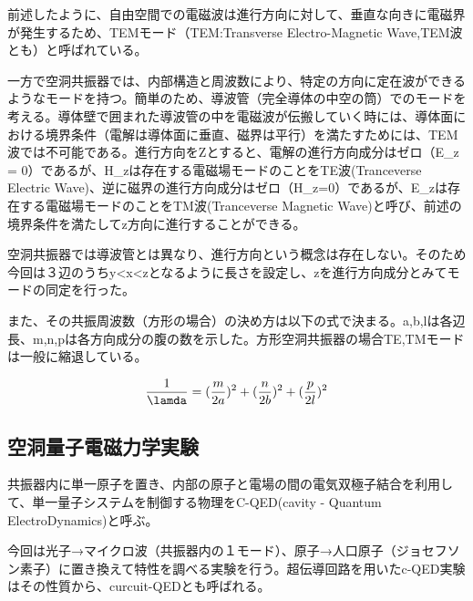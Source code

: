 前述したように、自由空間での電磁波は進行方向に対して、垂直な向きに電磁界が発生するため、TEMモード（TEM:Transverse Electro-Magnetic Wave,TEM波とも）と呼ばれている。

一方で空洞共振器では、内部構造と周波数により、特定の方向に定在波ができるようなモードを持つ。簡単のため、導波管（完全導体の中空の筒）でのモードを考える。導体壁で囲まれた導波管の中を電磁波が伝搬していく時には、導体面における境界条件（電解は導体面に垂直、磁界は平行）を満たすためには、TEM波では不可能である。進行方向をZとすると、電解の進行方向成分はゼロ（E_z = 0）であるが、H_zは存在する電磁場モードのことをTE波(Tranceverse Electric Wave)、逆に磁界の進行方向成分はゼロ（H_z=0）であるが、E_zは存在する電磁場モードのことをTM波(Tranceverse Magnetic Wave)と呼び、前述の境界条件を満たしてz方向に進行することができる。

空洞共振器では導波管とは異なり、進行方向という概念は存在しない。そのため今回は３辺のうちy<x<zとなるように長さを設定し、zを進行方向成分とみてモードの同定を行った。

また、その共振周波数（方形の場合）の決め方は以下の式で決まる。a,b,lは各辺長、m,n,pは各方向成分の腹の数を示した。方形空洞共振器の場合TE,TMモードは一般に縮退している。

\[
 \frac{1}{\lamda} = (\frac{m}{2a})^2 + (\frac{n}{2b})^2 + (\frac{p}{2l})^2
\]

\subsection{空洞量子電磁力学実験}
共振器内に単一原子を置き、内部の原子と電場の間の電気双極子結合を利用して、単一量子システムを制御する物理をC-QED(cavity - Quantum ElectroDynamics)と呼ぶ。

今回は光子→マイクロ波（共振器内の１モード）、原子→人口原子（ジョセフソン素子）に置き換えて特性を調べる実験を行う。超伝導回路を用いたc-QED実験はその性質から、curcuit-QEDとも呼ばれる。
